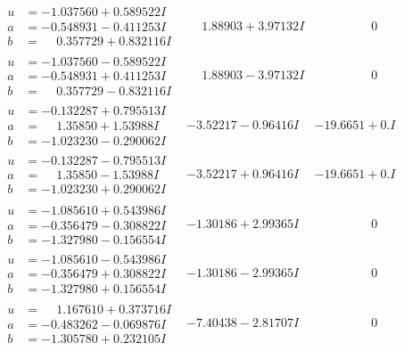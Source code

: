 \documentclass[1p]{elsarticle_modified}
\theoremstyle{definition}
\begin{document}
$$\begin{array}{c|c|c}
\begin{aligned}
u &= -1.037560 + 0.589522 I \\
a &= -0.548931 - 0.411253 I \\
b &= \phantom{-}0.357729 + 0.832116 I\end{aligned}
 & \phantom{-}1.88903 + 3.97132 I & \phantom{-0.000000 } 0 \\ \hline\begin{aligned}
u &= -1.037560 - 0.589522 I \\
a &= -0.548931 + 0.411253 I \\
b &= \phantom{-}0.357729 - 0.832116 I\end{aligned}
 & \phantom{-}1.88903 - 3.97132 I & \phantom{-0.000000 } 0 \\ \hline\begin{aligned}
u &= -0.132287 + 0.795513 I \\
a &= \phantom{-}1.35850 + 1.53988 I \\
b &= -1.023230 - 0.290062 I\end{aligned}
 & -3.52217 - 0.96416 I & -19.6651 + 0. I\phantom{ +0.000000I} \\ \hline\begin{aligned}
u &= -0.132287 - 0.795513 I \\
a &= \phantom{-}1.35850 - 1.53988 I \\
b &= -1.023230 + 0.290062 I\end{aligned}
 & -3.52217 + 0.96416 I & -19.6651 + 0. I\phantom{ +0.000000I} \\ \hline\begin{aligned}
u &= -1.085610 + 0.543986 I \\
a &= -0.356479 - 0.308822 I \\
b &= -1.327980 - 0.156554 I\end{aligned}
 & -1.30186 + 2.99365 I & \phantom{-0.000000 } 0 \\ \hline\begin{aligned}
u &= -1.085610 - 0.543986 I \\
a &= -0.356479 + 0.308822 I \\
b &= -1.327980 + 0.156554 I\end{aligned}
 & -1.30186 - 2.99365 I & \phantom{-0.000000 } 0 \\ \hline\begin{aligned}
u &= \phantom{-}1.167610 + 0.373716 I \\
a &= -0.483262 - 0.069876 I \\
b &= -1.305780 + 0.232105 I\end{aligned}
 & -7.40438 - 2.81707 I & \phantom{-0.000000 } 0 \\ \hline\begin{aligned}

\end{aligned}
\end{array}$$
\end{document}
